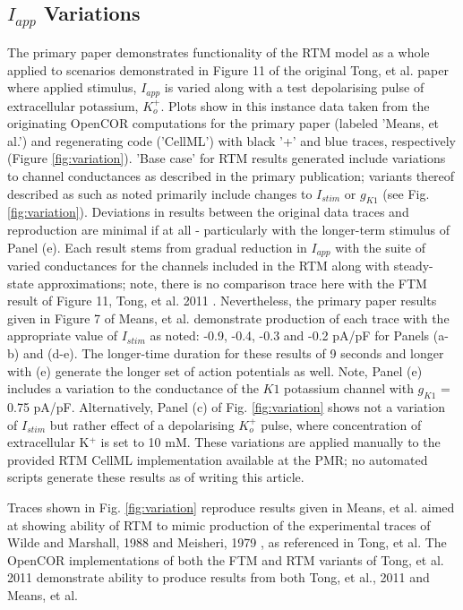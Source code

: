 \documentclass[fleqn,10pt]{physiome}
\newcommand{\po}{K$^+$ }
\begin{document}
\subsection{$I_{app}$ Variations}

The primary paper demonstrates functionality of the RTM model as a whole applied to scenarios demonstrated in Figure 11 of the original Tong, et al. paper where applied stimulus, $I_{app}$ is varied along with a test depolarising pulse of extracellular potassium, $K^+_o$. Plots show in this instance data taken from the originating OpenCOR computations for the primary paper (labeled 'Means, et al.') and regenerating code ('CellML') with black '+' and blue traces, respectively (Figure \ref{fig:variation}). 'Base case' for RTM results generated include variations to channel conductances as described in the primary publication; variants thereof described as such as noted primarily include changes to $I_{stim}$ or $g_{K1}$ (see Fig. \ref{fig:variation}). Deviations in results between the original data traces and reproduction are minimal if at all - particularly with the longer-term stimulus of Panel (e). Each result stems from gradual reduction in $I_{app}$ with the suite of varied conductances for the channels included in the RTM along with steady-state approximations; note, there is no comparison trace here with the FTM result of Figure 11, Tong, et al. 2011 \citep{tong2011}. Nevertheless, the primary paper results given in Figure 7 of Means, et al. \citep{means2022} demonstrate production of each trace with the appropriate value of $I_{stim}$ as noted: -0.9, -0.4, -0.3 and -0.2 pA/pF for Panels (a-b) and (d-e). The longer-time duration for these results of 9 seconds and longer with (e) generate the longer set of action potentials as well. Note, Panel (e) includes a variation to the conductance of the $K1$ potassium channel with $g_{K1}$ = 0.75 pA/pF. Alternatively, Panel (c) of Fig. \ref{fig:variation} shows not a variation of $I_{stim}$ but rather effect of a depolarising $K^+_o$ pulse, where concentration of extracellular \po is set to 10 mM. These variations are applied manually to the provided RTM CellML implementation available at the PMR; no automated scripts generate these results as of writing this article. 

Traces shown in Fig. \ref{fig:variation}  reproduce results given in Means, et al. aimed at showing ability of RTM to mimic production of the experimental traces of Wilde and Marshall, 1988 \citep{wilde1988} and Meisheri, 1979 \citep{meisheri1979}, as referenced in Tong, et al. The OpenCOR implementations of both the FTM and RTM variants of Tong, et al. 2011 demonstrate ability to produce results from both Tong, et al., 2011 and Means, et al.
\end{document}
